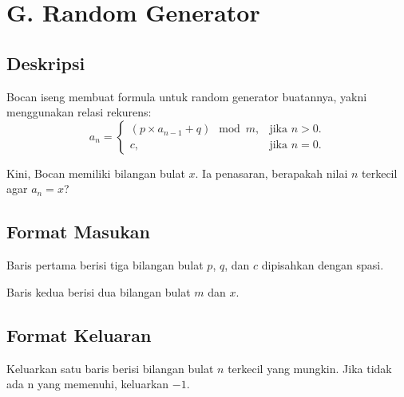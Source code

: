 \documentclass{article}
\begin{document}
\pagestyle{fancy}
\fancyhf{}
\renewcommand{\headrulewidth}{0pt}

\section*{\hfil G. Random Generator\hfil}


\subsection*{Deskripsi}

\par\noindent Bocan iseng membuat formula untuk random generator buatannya, yakni menggunakan relasi rekurens:
\begin{equation*}
  a_n=\begin{cases}
    (p \times a_{n-1} + q) \mod m, & \text{jika $n>0$}.\\
    c, & \text{jika $n=0$}.
  \end{cases}
\end{equation*}


\par\noindent Kini, Bocan memiliki bilangan bulat $x$. Ia penasaran, berapakah nilai $n$ terkecil agar $a_n = x$?

\subsection*{Format Masukan}

\par\noindent Baris pertama berisi tiga bilangan bulat $p$, $q$, dan $c$ dipisahkan dengan spasi.
\par\noindent Baris kedua berisi dua bilangan bulat $m$ dan $x$.

\subsection*{Format Keluaran}

\par\noindent Keluarkan satu baris berisi bilangan bulat $n$ terkecil yang mungkin. Jika tidak ada n yang memenuhi, keluarkan $-1$.
\end{document}
